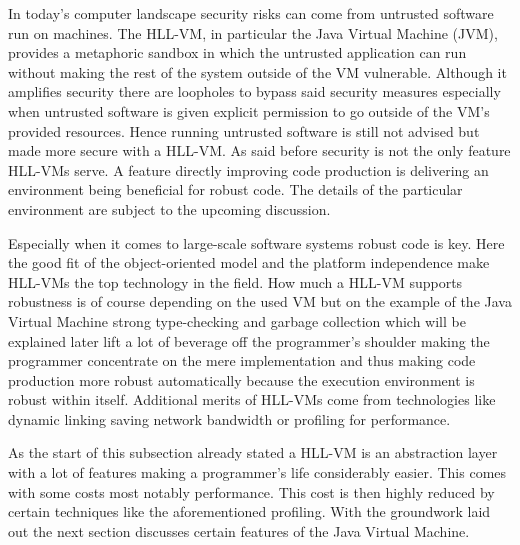 In today's computer landscape security risks can come from untrusted software run on machines. The HLL-VM, in particular the Java Virtual Machine (JVM),  provides a metaphoric sandbox in which the untrusted application can run without making the rest of the system outside of the VM vulnerable. Although it amplifies security there are loopholes to bypass said security measures especially when untrusted software is given explicit permission to go outside of the VM's provided resources. Hence running untrusted software is still not advised but made more secure with a HLL-VM. As said before security is not the only feature HLL-VMs serve. \cite{Smith}\cite{Lindhom} A feature directly improving code production is delivering an environment being beneficial for robust code. The details of the particular environment are subject to the upcoming discussion.

Especially when it comes to large-scale software systems robust code is key. Here the good fit of the object-oriented model and the platform independence make HLL-VMs the top technology in the field. How much a HLL-VM supports robustness is of course depending on the used VM but on the example of the Java Virtual Machine strong type-checking and garbage collection which will be explained later lift a lot of beverage off the programmer's shoulder making the programmer concentrate on the mere implementation and thus making code production more robust automatically because the execution environment is robust within itself. Additional merits of HLL-VMs come from technologies like dynamic linking saving network bandwidth or profiling for performance.\cite{Smith}

As the start of this subsection already stated a HLL-VM is an abstraction layer with a lot of features making a programmer's life considerably easier. This comes with some costs most notably performance. This cost is then highly reduced by certain techniques like the aforementioned profiling. With the groundwork laid out the next section discusses certain features of the Java Virtual Machine.

